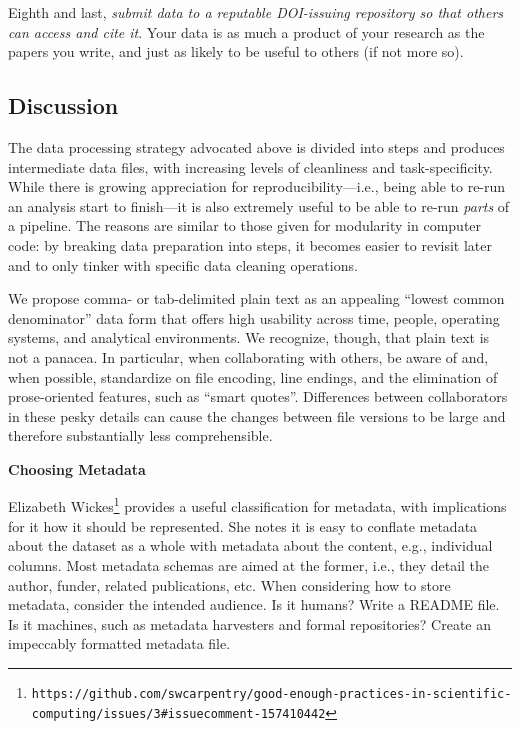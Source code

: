 \documentclass[10pt]{article}
\newcommand{\recommend}[1]{\textit{#1}}
\newcommand{\withurl}[2]{{#1}\footnote{\texttt{#2}}}
\begin{document}
Eighth and last, \recommend{submit data to a reputable DOI-issuing
  repository so that others can access and cite it}.  Your data is as
much a product of your research as the papers you write, and just as
likely to be useful to others (if not more so).

\subsection*{Discussion}

The data processing strategy advocated above is divided into steps and
produces intermediate data files, with increasing levels of cleanliness
and task-specificity. While there is growing appreciation for
reproducibility---i.e., being able to re-run an analysis start to
finish---it is also extremely useful to be able to re-run \emph{parts}
of a pipeline. The reasons are similar to those given for modularity in
computer code: by breaking data preparation into steps, it becomes
easier to revisit later and to only tinker with specific data cleaning
operations.

We propose comma- or tab-delimited plain text as an appealing ``lowest common
denominator'' data form that offers high usability across time, people,
operating systems, and analytical environments. We recognize, though,
that plain text is not a panacea. In particular, when collaborating with
others, be aware of and, when possible, standardize on file encoding,
line endings, and the elimination of prose-oriented features, such as
``smart quotes''. Differences between collaborators in these pesky
details can cause the changes between file versions to be large and
therefore substantially less comprehensible.

\begin{framed}
\noindent \textbf{Choosing Metadata}

\withurl{Elizabeth Wickes}{https://github.com/swcarpentry/good-enough-practices-in-scientific-computing/issues/3\#issuecomment-157410442}
provides a useful classification for metadata, with implications for
it how it should be represented. She notes it is easy to conflate
metadata about the dataset as a whole with metadata about the content,
e.g., individual columns. Most metadata schemas are aimed at the
former, i.e., they detail the author, funder, related publications,
etc. When considering how to store metadata, consider the intended
audience. Is it humans? Write a README file. Is it machines, such as
metadata harvesters and formal repositories? Create an impeccably
formatted metadata file.
\end{framed}
\end{document}
